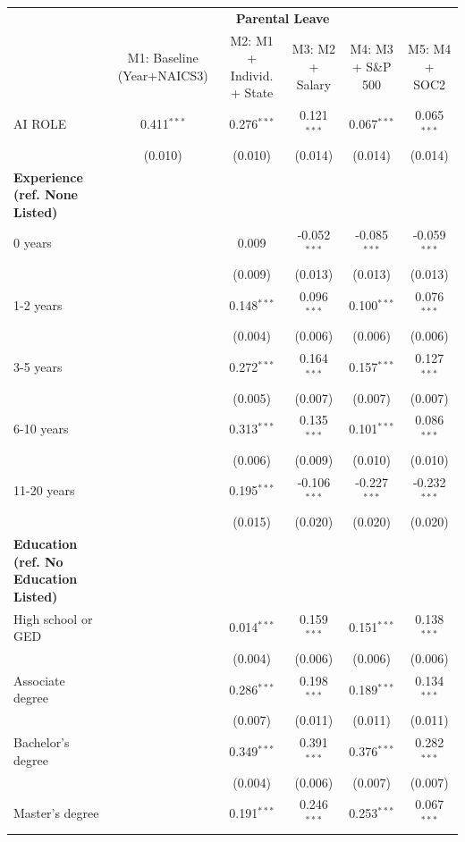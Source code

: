 \begin{table}[!htbp]
\centering
\tiny
\begin{tabular}{lccccc}
\toprule
 & \multicolumn{5}{c}{\textbf{Parental Leave}} \\
 & M1: Baseline (Year+NAICS3) & M2: M1 + Individ. + State & M3: M2 + Salary & M4: M3 + S\&P 500 & M5: M4 + SOC2 \\
\midrule
AI ROLE & 0.411$^{***}$ & 0.276$^{***}$ & 0.121$^{***}$ & 0.067$^{***}$ & 0.065$^{***}$ \\
 & (0.010) & (0.010) & (0.014) & (0.014) & (0.014) \\
\midrule
\textbf{Experience (ref. None Listed)} &  &  &  &  &  \\
0 years &  & 0.009 & -0.052$^{***}$ & -0.085$^{***}$ & -0.059$^{***}$ \\
 &  & (0.009) & (0.013) & (0.013) & (0.013) \\
1-2 years &  & 0.148$^{***}$ & 0.096$^{***}$ & 0.100$^{***}$ & 0.076$^{***}$ \\
 &  & (0.004) & (0.006) & (0.006) & (0.006) \\
3-5 years &  & 0.272$^{***}$ & 0.164$^{***}$ & 0.157$^{***}$ & 0.127$^{***}$ \\
 &  & (0.005) & (0.007) & (0.007) & (0.007) \\
6-10 years &  & 0.313$^{***}$ & 0.135$^{***}$ & 0.101$^{***}$ & 0.086$^{***}$ \\
 &  & (0.006) & (0.009) & (0.010) & (0.010) \\
11-20 years &  & 0.195$^{***}$ & -0.106$^{***}$ & -0.227$^{***}$ & -0.232$^{***}$ \\
 &  & (0.015) & (0.020) & (0.020) & (0.020) \\
\midrule
\textbf{Education (ref. No Education Listed)} &  &  &  &  &  \\
High school or GED &  & 0.014$^{***}$ & 0.159$^{***}$ & 0.151$^{***}$ & 0.138$^{***}$ \\
 &  & (0.004) & (0.006) & (0.006) & (0.006) \\
Associate degree &  & 0.286$^{***}$ & 0.198$^{***}$ & 0.189$^{***}$ & 0.134$^{***}$ \\
 &  & (0.007) & (0.011) & (0.011) & (0.011) \\
Bachelor's degree &  & 0.349$^{***}$ & 0.391$^{***}$ & 0.376$^{***}$ & 0.282$^{***}$ \\
 &  & (0.004) & (0.006) & (0.007) & (0.007) \\
Master's degree &  & 0.191$^{***}$ & 0.246$^{***}$ & 0.253$^{***}$ & 0.067$^{***}$ \\

\end{tabular}
\end{table}
